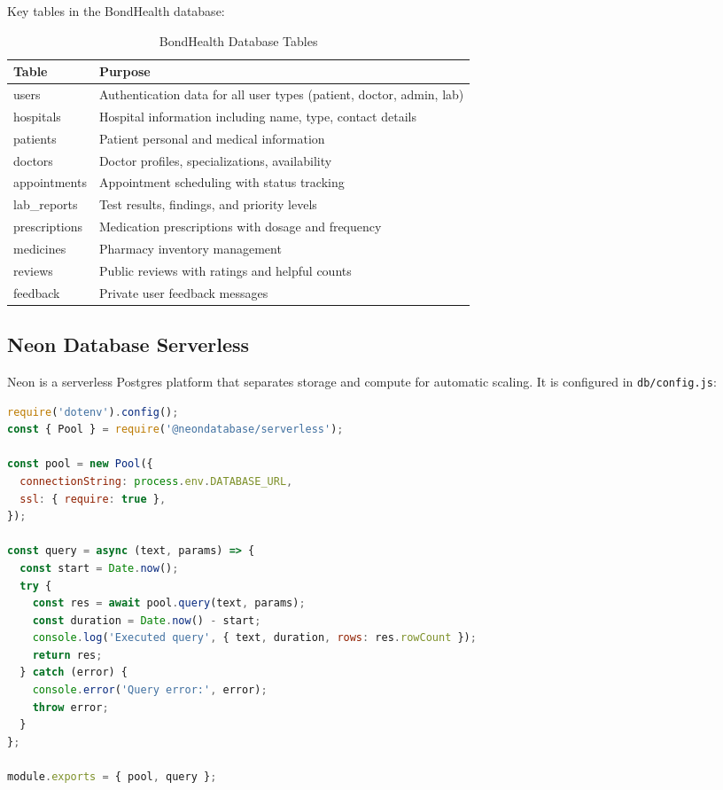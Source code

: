 \noindent Key tables in the BondHealth database:

\begin{table}[H]
\centering
\begin{tabular}{|l|p{8cm}|}
\hline
\textbf{Table} & \textbf{Purpose} \\
\hline
users & Authentication data for all user types (patient, doctor, admin, lab) \\
\hline
hospitals & Hospital information including name, type, contact details \\
\hline
patients & Patient personal and medical information \\
\hline
doctors & Doctor profiles, specializations, availability \\
\hline
appointments & Appointment scheduling with status tracking \\
\hline
lab\_reports & Test results, findings, and priority levels \\
\hline
prescriptions & Medication prescriptions with dosage and frequency \\
\hline
medicines & Pharmacy inventory management \\
\hline
reviews & Public reviews with ratings and helpful counts \\
\hline
feedback & Private user feedback messages \\
\hline
\end{tabular}
\caption{BondHealth Database Tables}
\label{tab:tables}
\end{table}

\subsection{Neon Database Serverless}

\justifying
\noindent Neon is a serverless Postgres platform that separates storage and compute for automatic scaling. It is configured in \texttt{db/config.js}:

\begin{lstlisting}[language=JavaScript, caption=Neon Database Configuration, basicstyle=\ttfamily\small, breaklines=true]
require('dotenv').config();
const { Pool } = require('@neondatabase/serverless');

const pool = new Pool({
  connectionString: process.env.DATABASE_URL,
  ssl: { require: true },
});

const query = async (text, params) => {
  const start = Date.now();
  try {
    const res = await pool.query(text, params);
    const duration = Date.now() - start;
    console.log('Executed query', { text, duration, rows: res.rowCount });
    return res;
  } catch (error) {
    console.error('Query error:', error);
    throw error;
  }
};

module.exports = { pool, query };
\end{lstlisting}

